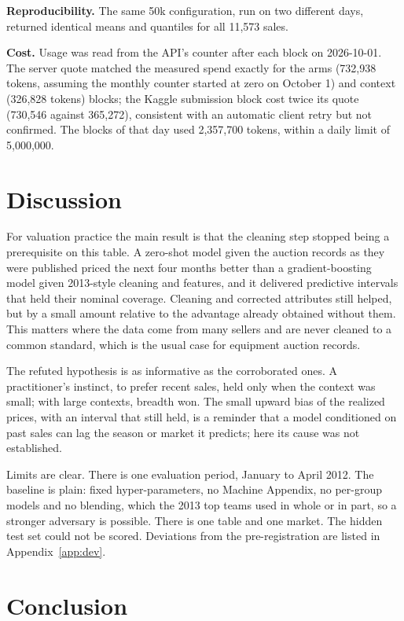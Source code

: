 \documentclass[11pt,a4paper]{article}
\begin{document}
\textbf{Reproducibility.} The same 50k configuration, run on two different days, returned identical means and quantiles for all 11,573 sales.

\textbf{Cost.} Usage was read from the API's counter after each block on 2026-10-01. The server quote matched the measured spend exactly for the arms (732,938 tokens, assuming the monthly counter started at zero on October 1) and context (326,828 tokens) blocks; the Kaggle submission block cost twice its quote (730,546 against 365,272), consistent with an automatic client retry but not confirmed. The blocks of that day used 2,357,700 tokens, within a daily limit of 5,000,000.

\section{Discussion}

For valuation practice the main result is that the cleaning step stopped being a prerequisite on this table. A zero-shot model given the auction records as they were published priced the next four months better than a gradient-boosting model given 2013-style cleaning and features, and it delivered predictive intervals that held their nominal coverage. Cleaning and corrected attributes still helped, but by a small amount relative to the advantage already obtained without them. This matters where the data come from many sellers and are never cleaned to a common standard, which is the usual case for equipment auction records.

The refuted hypothesis is as informative as the corroborated ones. A practitioner's instinct, to prefer recent sales, held only when the context was small; with large contexts, breadth won. The small upward bias of the realized prices, with an interval that still held, is a reminder that a model conditioned on past sales can lag the season or market it predicts; here its cause was not established.

Limits are clear. There is one evaluation period, January to April 2012. The baseline is plain: fixed hyper-parameters, no Machine Appendix, no per-group models and no blending, which the 2013 top teams used in whole or in part, so a stronger adversary is possible. There is one table and one market. The hidden test set could not be scored. Deviations from the pre-registration are listed in Appendix~\ref{app:dev}.

\section{Conclusion}
\end{document}
